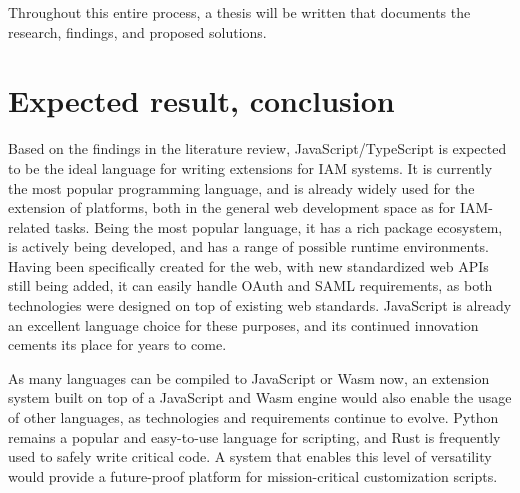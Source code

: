 Throughout this entire process, a thesis will be written that documents the research, findings, and proposed solutions.


\section{Expected result, conclusion}%
\label{sec:expected_results}

Based on the findings in the literature review, JavaScript/TypeScript is expected to be the ideal language for writing extensions for IAM systems. It is currently the most popular programming language, and is already widely used for the extension of platforms, both in the general web development space as for IAM-related tasks. Being the most popular language, it has a rich package ecosystem, is actively being developed, and has a range of possible runtime environments. Having been specifically created for the web, with new standardized web APIs still being added, it can easily handle OAuth and SAML requirements, as both technologies were designed on top of existing web standards. JavaScript is already an excellent language choice for these purposes, and its continued innovation cements its place for years to come.

As many languages can be compiled to JavaScript or Wasm now, an extension system built on top of a JavaScript and Wasm engine would also enable the usage of other languages, as technologies and requirements continue to evolve. Python remains a popular and easy-to-use language for scripting, and Rust is frequently used to safely write critical code. A system that enables this level of versatility would provide a future-proof platform for mission-critical customization scripts.

